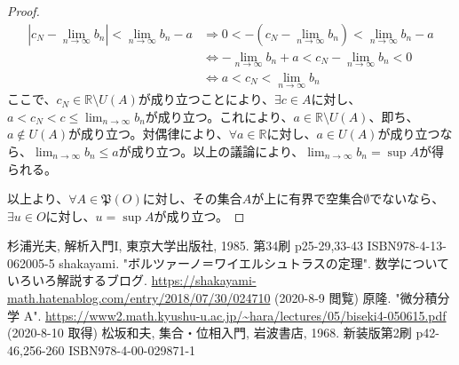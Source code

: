 \documentclass[dvipdfmx]{jsarticle}
\begin{document}
\begin{proof}
\begin{align*}
\left| c_{N} - \lim_{n \rightarrow \infty}b_{n} \right| < \lim_{n \rightarrow \infty}b_{n} - a &\Rightarrow 0 < - \left( c_{N} - \lim_{n \rightarrow \infty}b_{n} \right) < \lim_{n \rightarrow \infty}b_{n} - a\\
&\Leftrightarrow - \lim_{n \rightarrow \infty}b_{n} + a < c_{N} - \lim_{n \rightarrow \infty}b_{n} < 0\\
&\Leftrightarrow a < c_{N} < \lim_{n \rightarrow \infty}b_{n}
\end{align*}
ここで、$c_{N} \in \mathbb{R} \setminus U(A)$が成り立つことにより、$\exists c \in A$に対し、$a < c_{N} < c \leq \lim_{n \rightarrow \infty}b_{n}$が成り立つ。これにより、$a \in \mathbb{R} \setminus U(A)$、即ち、$a \notin U(A)$が成り立つ。対偶律により、$\forall a \in \mathbb{R}$に対し、$a \in U(A)$が成り立つなら、$\lim_{n \rightarrow \infty}b_{n} \leq a$が成り立つ。以上の議論により、$\lim_{n \rightarrow \infty}b_{n} = \sup A$が得られる。\par
以上より、$\forall A \in \mathfrak{P}(O)$に対し、その集合$A$が上に有界で空集合$\emptyset$でないなら、$\exists u \in O$に対し、$u = \sup A$が成り立つ。
\end{proof}
\begin{thebibliography}{50}
  杉浦光夫, 解析入門I, 東京大学出版社, 1985. 第34刷 p25-29,33-43 ISBN978-4-13-062005-5
  shakayami. "ボルツァーノ＝ワイエルシュトラスの定理". 数学についていろいろ解説するブログ. \url{https://shakayami-math.hatenablog.com/entry/2018/07/30/024710} (2020-8-9 閲覧)
  原隆. "微分積分学 A". \url{https://www2.math.kyushu-u.ac.jp/~hara/lectures/05/biseki4-050615.pdf} (2020-8-10 取得)
  松坂和夫, 集合・位相入門, 岩波書店, 1968. 新装版第2刷 p42-46,256-260 ISBN978-4-00-029871-1
\end{thebibliography}
\end{document}
